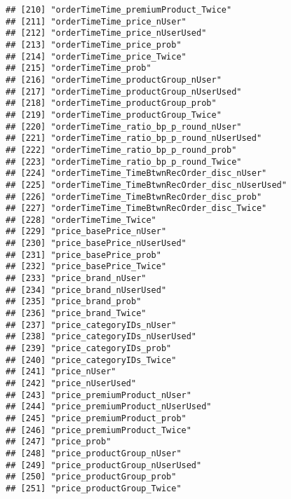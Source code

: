 \documentclass[10pt]{report}
\begin{document}
\begin{verbatim}
## [210] "orderTimeTime_premiumProduct_Twice"                 
## [211] "orderTimeTime_price_nUser"                          
## [212] "orderTimeTime_price_nUserUsed"                      
## [213] "orderTimeTime_price_prob"                           
## [214] "orderTimeTime_price_Twice"                          
## [215] "orderTimeTime_prob"                                 
## [216] "orderTimeTime_productGroup_nUser"                   
## [217] "orderTimeTime_productGroup_nUserUsed"               
## [218] "orderTimeTime_productGroup_prob"                    
## [219] "orderTimeTime_productGroup_Twice"                   
## [220] "orderTimeTime_ratio_bp_p_round_nUser"               
## [221] "orderTimeTime_ratio_bp_p_round_nUserUsed"           
## [222] "orderTimeTime_ratio_bp_p_round_prob"                
## [223] "orderTimeTime_ratio_bp_p_round_Twice"               
## [224] "orderTimeTime_TimeBtwnRecOrder_disc_nUser"          
## [225] "orderTimeTime_TimeBtwnRecOrder_disc_nUserUsed"      
## [226] "orderTimeTime_TimeBtwnRecOrder_disc_prob"           
## [227] "orderTimeTime_TimeBtwnRecOrder_disc_Twice"          
## [228] "orderTimeTime_Twice"                                
## [229] "price_basePrice_nUser"                              
## [230] "price_basePrice_nUserUsed"                          
## [231] "price_basePrice_prob"                               
## [232] "price_basePrice_Twice"                              
## [233] "price_brand_nUser"                                  
## [234] "price_brand_nUserUsed"                              
## [235] "price_brand_prob"                                   
## [236] "price_brand_Twice"                                  
## [237] "price_categoryIDs_nUser"                            
## [238] "price_categoryIDs_nUserUsed"                        
## [239] "price_categoryIDs_prob"                             
## [240] "price_categoryIDs_Twice"                            
## [241] "price_nUser"                                        
## [242] "price_nUserUsed"                                    
## [243] "price_premiumProduct_nUser"                         
## [244] "price_premiumProduct_nUserUsed"                     
## [245] "price_premiumProduct_prob"                          
## [246] "price_premiumProduct_Twice"                         
## [247] "price_prob"                                         
## [248] "price_productGroup_nUser"                           
## [249] "price_productGroup_nUserUsed"                       
## [250] "price_productGroup_prob"                            
## [251] "price_productGroup_Twice"                           

\end{verbatim}
\end{document}
